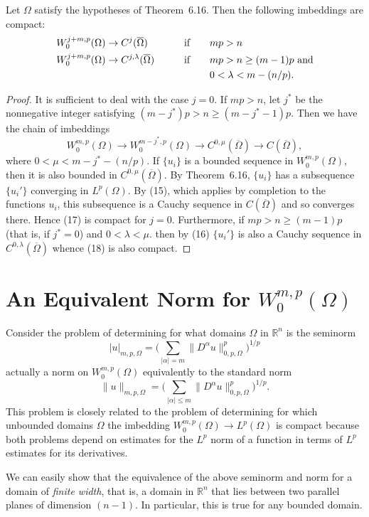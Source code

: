 \begin{theorem}
  Let $\Omega$ satisfy the hypotheses of Theorem~6.16. Then the following imbeddings are compact:
  \begin{alignat}{3}
    W_0^{j+m,p}(\Omega) & \to C^j(\overline{\Omega})  &\qquad& \text{if} &\quad& mp>n \label{eq:6.17} \\
    W_0^{j+m,p}(\Omega) & \to C^{j,\lambda}(\overline{\Omega}) && \text{if} && mp>n\geq (m-1)p\ \text{and} \notag \\
    &&&&& 0<\lambda<m-(n/p). \label{eq:6.18}
  \end{alignat}
\end{theorem}

\begin{proof}
  It is sufficient to deal with the case $j=0$. If $mp>n$, let $j^*$ be the nonnegative integer
  satisfying $(m-j^*)p>n\geq (m-j^*-1)p$. Then we have the chain of imbeddings
  \[ W_0^{m,p}(\Omega) \to W_0^{m-j^*,p}(\Omega) \to C^{0,\mu}(\overline{\Omega})
      \to C(\overline{\Omega}), \]
  where $0<\mu<m-j^*-(n/p)$. If $\{u_i\}$ is a bounded sequence in $W_0^{m,p}(\Omega)$,
  then it is also bounded in $C^{0,\mu}(\overline{\Omega})$.
  By Theorem~6.16, $\{u_i\}$ has a subsequence $\{u_i'\}$ converging in $L^p(\Omega)$.
  By (15), which applies by completion to the functions $u_i$,
  this subsequence is a Cauchy sequence in $C(\overline{\Omega})$ and so converges there.
  Hence (17) is compact for $j=0$. Furthermore, if $mp>n\geq (m-1)p$
  (that is, if $j^*=0$) and $0<\lambda<\mu$. then by (16) $\{u_i'\}$ is also a Cauchy sequence
  in $C^{0,\lambda}(\overline{\Omega})$ whence (18) is also compact.
\end{proof}


\section{An Equivalent Norm for $W_0^{m,p}(\Omega)$}

\begin{para}
  Consider the problem of determining for what domains $\Omega$ in $\mathbb{R}^n$ is
  the seminorm
  \[ |u|_{m,p,\Omega} = \biggl(\sum_{|\alpha|=m} \|D^\alpha u\|^p_{0,p,\Omega}\biggr)^{1/p} \]
  actually a norm on $W_0^{m,p}(\Omega)$ equivalently to the standard norm
  \[ \|u\|_{m,p,\Omega} = \biggl(\sum_{|\alpha|\leq m} \|D^\alpha u\|^p_{0,p,\Omega}\biggr)^{1/p}. \]
  This problem is closely related to the problem of determining for which unbounded
  domains $\Omega$ the imbedding $W_0^{m,p}(\Omega)\to L^p(\Omega)$ is compact
  because both problems depend on estimates for the $L^p$ norm of a function in terms of
  $L^p$ estimates for its derivatives.

  We can easily show that the equivalence of the above seminorm and norm for a domain
  of \emph{finite width}, that is, a domain in $\mathbb{R}^n$ that lies between two
  parallel planes of dimension $(n-1)$. In particular, this is true for any bounded domain.
\end{para}


